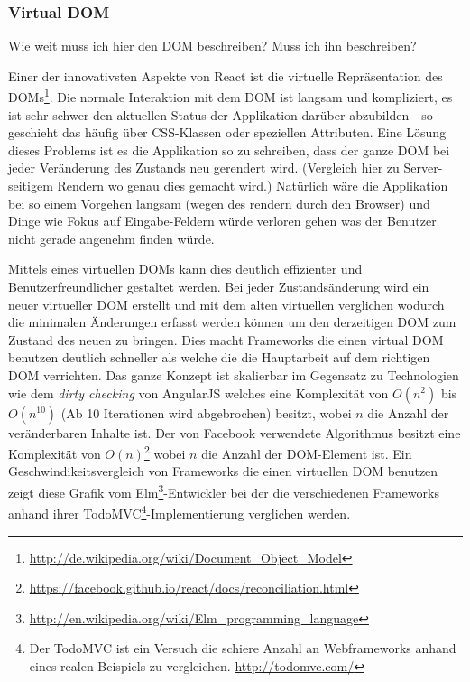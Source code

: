 \documentclass[12pt,twoside]{book}
\begin{document}
\subsubsection*{Virtual DOM}

Wie weit muss ich hier den DOM beschreiben? Muss ich ihn beschreiben?

Einer der innovativsten Aspekte von React ist die virtuelle Repräsentation des DOMs\footnote{\url{http://de.wikipedia.org/wiki/Document_Object_Model}}. Die normale Interaktion mit dem DOM ist langsam und kompliziert, es ist sehr schwer den aktuellen Status der Applikation darüber abzubilden - so geschieht das häufig über CSS-Klassen oder speziellen Attributen.
Eine Lösung dieses Problems ist es die Applikation so zu schreiben, dass der ganze DOM bei jeder Veränderung des Zustands neu gerendert wird. (Vergleich hier zu Server-seitigem Rendern wo genau dies gemacht wird.) Natürlich wäre die Applikation bei so einem Vorgehen langsam (wegen des rendern durch den Browser) und Dinge wie Fokus auf Eingabe-Feldern würde verloren gehen was der Benutzer nicht gerade angenehm finden würde.

Mittels eines virtuellen DOMs kann dies deutlich effizienter und Benutzerfreundlicher gestaltet werden. Bei jeder Zustandsänderung wird ein neuer virtueller DOM erstellt und mit dem alten virtuellen verglichen wodurch die minimalen Änderungen erfasst werden können um den derzeitigen DOM zum Zustand des neuen zu bringen. Dies macht Frameworks die einen virtual DOM benutzen deutlich schneller als welche die die Hauptarbeit auf dem richtigen DOM verrichten. Das ganze Konzept ist skalierbar im Gegensatz zu Technologien wie dem \textit{dirty checking} von AngularJS welches eine Komplexität von $O(n^2)$ bis $O(n^10)$ (Ab 10 Iterationen wird abgebrochen) besitzt, wobei $n$ die Anzahl der veränderbaren Inhalte ist.
Der von Facebook verwendete Algorithmus besitzt eine Komplexität von $O(n)$\footnote{\url{https://facebook.github.io/react/docs/reconciliation.html}} wobei $n$ die Anzahl der DOM-Element ist.
Ein Geschwindikeitsvergleich von Frameworks die einen virtuellen DOM benutzen zeigt diese Grafik vom Elm\footnote{\url{http://en.wikipedia.org/wiki/Elm_programming_language}}-Entwickler bei der die verschiedenen Frameworks anhand ihrer TodoMVC\footnote{Der TodoMVC ist ein Versuch die schiere Anzahl an Webframeworks anhand eines realen Beispiels zu vergleichen. \url{http://todomvc.com/}}-Implementierung verglichen werden.
\end{document}
